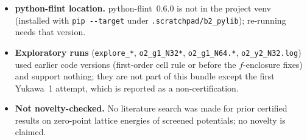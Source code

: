 \documentclass[10pt]{article}
\begin{document}
\begin{itemize}
\item \textbf{python-flint location.} python-flint~0.6.0 is not in the project venv (installed with \texttt{pip -{}-target} under \texttt{.scratchpad/b2\_pylib}); re-running needs that version.
\item \textbf{Exploratory runs} (\texttt{explore\_*}, \texttt{o2\_g1\_N32*}, \texttt{o2\_g1\_N64.*}, \texttt{o2\_y2\_N32.log}) used earlier code versions (first-order cell rule or before the $f$-enclosure fixes) and support nothing; they are not part of this bundle except the first Yukawa~1 attempt, which is reported as a non-certification.
\item \textbf{Not novelty-checked.} No literature search was made for prior certified results on zero-point lattice energies of screened potentials; no novelty is claimed.
\end{itemize}

\end{document}
